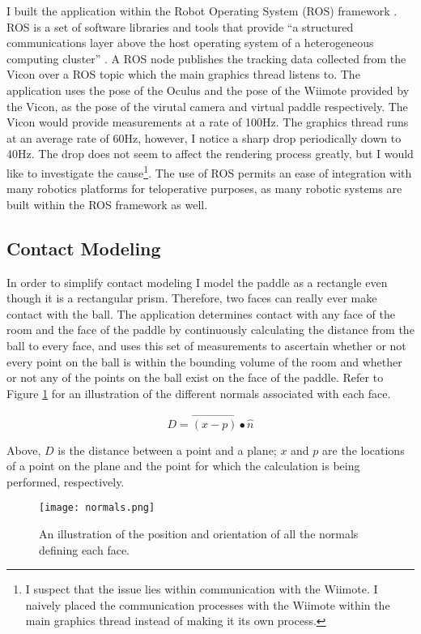 I built the application within the Robot Operating System (ROS) framework
\cite{website:ros}. ROS is a set of software libraries and tools that provide
``a structured communications layer above the host operating system of a
heterogeneous computing cluster'' \cite{quigley2009ros}. A ROS node publishes
the tracking data collected from the Vicon over a ROS topic which the main
graphics thread listens to. The application uses the pose of the Oculus and the
pose of the Wiimote provided by the Vicon, as the pose of the virutal camera
and virtual paddle respectively. The Vicon would provide measurements at a rate
of 100Hz. The graphics thread runs at an average rate of 60Hz, however, I
notice a sharp drop periodically down to 40Hz. The drop does not seem to affect
the rendering process greatly, but I would like to investigate the
cause\footnote{I suspect that the issue lies within communication with the
Wiimote. I naively placed the communication processes with the Wiimote within
the main graphics thread instead of making it its own process.}. The use of ROS
permits an ease of integration with many robotics platforms for teloperative
purposes, as many robotic systems are built within the ROS framework as well.

\subsection{Contact Modeling}

In order to simplify contact modeling I model the paddle as a rectangle even
though it is a rectangular prism. Therefore, two faces can really ever make
contact with the ball. The application determines contact with any face of the
room and the face of the paddle by continuously calculating the distance from
the ball to every face, and uses this set of measurements to ascertain whether
or not every point on the ball is within the bounding volume of the room and
whether or not any of the points on the ball exist on the face of the paddle.
Refer to Figure \ref{fig:normals} for an illustration of the different normals
associated with each face.

\[
D = \vec{(x - p)} \bullet \hat{n}
\]

Above, $D$ is the distance between a point and a plane; $x$ and $p$ are
the locations of a point on the plane and the point for which the calculation
is being performed, respectively.
\smallskip


\begin{figure}[]
\centering
\texttt{[image: normals.png]}
\caption{An illustration of the position and orientation of all the 
normals defining each face.}
\label{fig:normals}
\end{figure}

